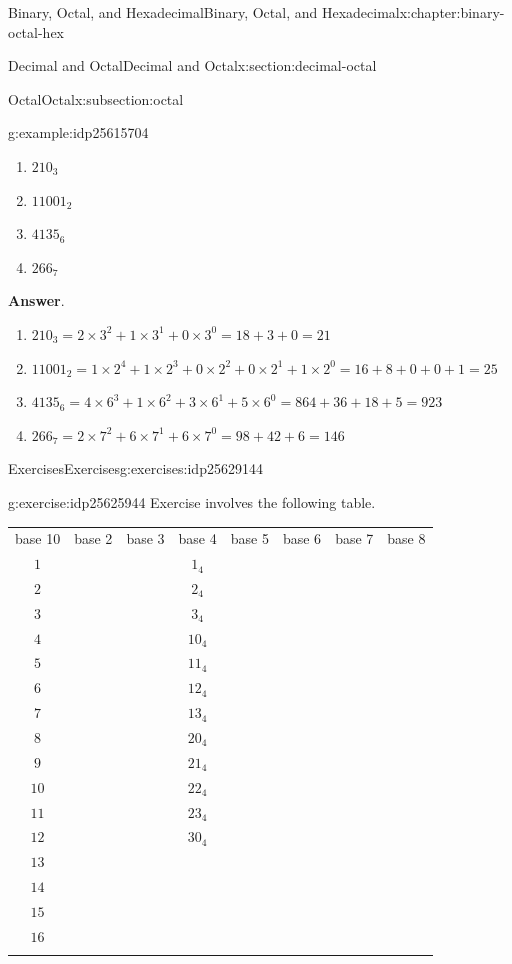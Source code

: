 \documentclass[twoside,10pt,]{book}
\newcommand{\blocktitlefont}{\relax}
\newcommand{\tabularfont}{\relax}
\numberwithin{equation}{section}
\newcommand{\hrulethin}  {\noalign{\hrule height 0.04em}}
\newcommand{\hrulemedium}{\noalign{\hrule height 0.07em}}
\newcommand{\hrulethick} {\noalign{\hrule height 0.11em}}
\begin{document}
\begin{chapterptx}{Binary, Octal, and Hexadecimal}{}{Binary, Octal, and Hexadecimal}{}{}{x:chapter:binary-octal-hex}
\begin{sectionptx}{Decimal and Octal}{}{Decimal and Octal}{}{}{x:section:decimal-octal}
\begin{subsectionptx}{Octal}{}{Octal}{}{}{x:subsection:octal}
\begin{example}{}{g:example:idp25615704}
\begin{enumerate}
\item{}\(\displaystyle 210_3\)%
\item{}\(\displaystyle 11001_2\)%
\item{}\(\displaystyle 4135_6\)%
\item{}\(\displaystyle 266_7\)%
\end{enumerate}
%
\par\smallskip%
\noindent\textbf{\blocktitlefont Answer}.\label{g:answer:idp25629912}{}\hypertarget{g:answer:idp25629912}{}\quad{}%
\begin{enumerate}
\item{}\(\displaystyle 210_3=2\times 3^2+1\times 3^1+0\times 3^0=18+3+0=21\)%
\item{}\(\displaystyle 11001_2=1\times 2^4+1\times 2^3+0\times 2^2+0\times 2^1+1\times 2^0=16+8+0+0+1=25\)%
\item{}\(\displaystyle 4135_6=4\times 6^3+1\times 6^2+3\times 6^1+5\times 6^0=864+36+18+5=923\)%
\item{}\(\displaystyle 266_7=2\times 7^2+6\times 7^1+6\times 7^0=98+42+6=146\)%
\end{enumerate}
%
\end{example}
\end{subsectionptx}
%
%
\typeout{************************************************}
\typeout{************************************************}
%
\begin{exercises-subsection}{Exercises}{}{Exercises}{}{}{g:exercises:idp25629144}
\begin{divisionexercise}{1}{}{}{g:exercise:idp25625944}%
Exercise involves the following table. \begin{center}%
{\tabularfont%
\begin{tabular}{cccccccc}\hrulethick
base 10&base 2&base 3&base 4&base 5&base 6&base 7&base 8\tabularnewline\hrulemedium
\(1\)&&&\(1_4\)&&&&\tabularnewline\hrulethin
\(2\)&&&\(2_4\)&&&&\tabularnewline\hrulethin
\(3\)&&&\(3_4\)&&&&\tabularnewline\hrulethin
\(4\)&&&\(10_4\)&&&&\tabularnewline\hrulethin
\(5\)&&&\(11_4\)&&&&\tabularnewline\hrulethin
\(6\)&&&\(12_4\)&&&&\tabularnewline\hrulethin
\(7\)&&&\(13_4\)&&&&\tabularnewline\hrulethin
\(8\)&&&\(20_4\)&&&&\tabularnewline\hrulethin
\(9\)&&&\(21_4\)&&&&\tabularnewline\hrulethin
\(10\)&&&\(22_4\)&&&&\tabularnewline\hrulethin
\(11\)&&&\(23_4\)&&&&\tabularnewline\hrulethin
\(12\)&&&\(30_4\)&&&&\tabularnewline\hrulethin
\(13\)&&&&&&&\tabularnewline\hrulethin
\(14\)&&&&&&&\tabularnewline\hrulethin
\(15\)&&&&&&&\tabularnewline\hrulethin
\(16\)&&&&&&&\tabularnewline\hrulethin

\end{tabular}}
\end{center}
\end{divisionexercise}
\end{exercises-subsection}
\end{sectionptx}
\end{chapterptx}
\end{document}
